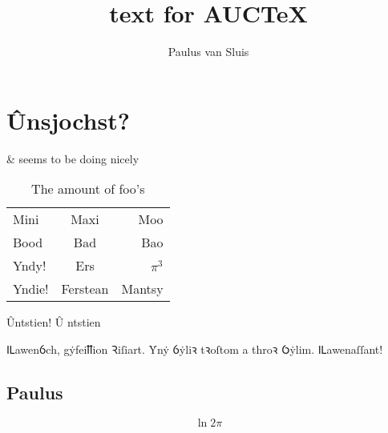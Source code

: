 \documentclass[a4paper]{memoir}
\title{text for AUC\TeX}
\author{Paulus van Sluis}
\begin{document}
\chapter{Ûnsjochst?}
\&   seems to be doing nicely

\begin{table}[h]
  \centering
  \begin{tabular}{lcr}\toprule
    Mini & Maxi & Moo\\
    Bood & Bad & Bao \\\midrule
    Yndy! & Ers & \(\pi^{3}\)\\
    Yndie! & Ferstean & Mantsy \\\bottomrule
  \end{tabular}
  \caption{The amount of foo's}
  \label{tab:foos}
\end{table}
Ûntstien! \^U%
ntstien

\autocite{harvey_aspects_1984}
\autocite{lewis_concise_1974}

Ỻawenỽch, gẏfeiỻion Ꝛiſiart. Ẏnẏ ỽẏliꝛ tꝛoſtom a throꝛ Ỽẏlim. Ỻawenaſſant!

\printbibliography
\section{Paulus}

\[\ln{2}\pi\]


\end{document}

